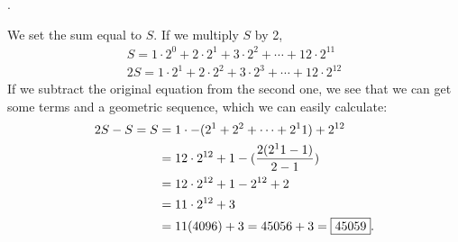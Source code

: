 \documentclass[11pt]{article}
\DeclareRobustCommand{\frac}[3][0pt]{%
  {\begingroup\hspace{#1}#2\hspace{#1}\endgroup\over\hspace{#1}#3\hspace{#1}}}
\begin{document}
\begin{answer}
.
\end{answer}
\begin{solution}
We set the sum equal to $S$. If we multiply $S$ by 2,
\begin{align*}
S = 1\cdot2^{0} + 2\cdot2^1 + 3\cdot2^2 +\cdots+12\cdot2^{11} \\
2S = 1\cdot2^{1} + 2\cdot2^2 + 3\cdot2^3 +\cdots+12\cdot2^{12}
\end{align*}
If we subtract the original equation from the second one, we see that we can get some terms and a geometric sequence, which we can easily calculate:
\begin{align*}
2S-S=S &=1 \cdot - (2^1+2^2+\cdots+2^11)+2^{12} \\
&= 12\cdot 2^{12}+1 - (\frac{2(2^11-1)}{2-1}) \\
&= 12\cdot 2^{12}+1-2^{12}+2 \\
&= 11 \cdot 2^{12} +3 \\
&= 11(4096) +3 = 45056+3 = \boxed{45059}.
\end{align*}
\end{solution}
\end{document}
